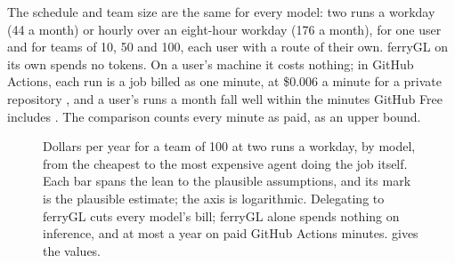 \documentclass[11pt,a4paper]{article}
\newcommand{\ferry}{ferryGL}
\begin{document}
The schedule and team size are the same for every model: two runs a workday (44 a month) or
hourly over an eight-hour workday (176 a month), for one user and for teams of 10, 50 and 100,
each user with a route of their own. \ferry{} on its own spends no tokens. On a user's machine it
costs nothing; in GitHub Actions, each run is a job billed as one minute, at \$0.006 a minute
for a private repository \cite{github2026actionspricing}, and a user's
\CmpActionsMinutesMonth{} runs a month fall well within the \CmpActionsFreeMinutes{} minutes
GitHub Free includes \cite{github2026actionsbilling}. The comparison counts every minute as paid,
as an upper bound.

\begin{figure}[t]
  \centering
  
  \caption{Dollars per year for a team of 100 at two runs a workday, by model, from the cheapest
    to the most expensive agent doing the job itself. Each bar spans the lean to the plausible
    assumptions, and its mark is the plausible estimate; the axis is logarithmic. Delegating to
    \ferry{} cuts every model's bill; \ferry{} alone spends nothing on inference, and at most
    \CmpActionsHundredYear{} a year on paid GitHub Actions minutes.  gives the
    values.}
  \label{fig:models}
\end{figure}
\end{document}
